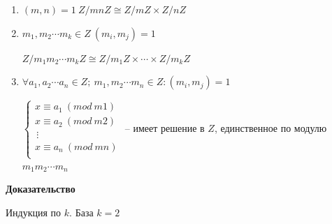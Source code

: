 \documentclass[14pt, letter paper]{article}
\begin{document}
\begin{enumerate}
    \item $(m, n) = 1\ Z/mnZ \cong Z/mZ \times Z/nZ$
    \item $m_1, m_2 \cdots m_k \in Z\ (m_i, m_j) = 1$

    $Z/m_1m_2\cdots m_kZ \cong Z/m_1Z \times \cdots \times Z/m_kZ$

    \item $\forall a_1, a_2 \cdots a_n \in Z;\ m_1, m_2 \cdots m_n \in Z : (m_i, m_j) = 1$

    $\begin{cases}
        x \equiv a_1\ (mod\ m1) \\
        x \equiv a_2\ (mod\ m2) \\
        \, \vdots \, \\
        x \equiv a_n\ (mod\ mn) \\
    \end{cases}$ -- имеет решение в $Z$, единственное по модулю $m_1 m_2 \cdots m_n$
\end{enumerate}

\begin{center}
    \textbf{Доказательство}
\end{center}

Индукция по $k$. База $k = 2$
\end{document}
